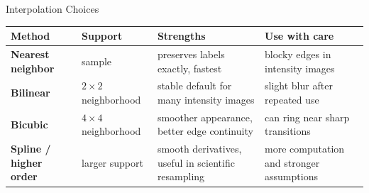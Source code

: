 \documentclass[aspectratio=169,10pt]{beamer}
\begin{document}
\begin{frame}{Interpolation Choices}
\small
\begin{tabularx}{\textwidth}{>{\bfseries}p{} >{\raggedright\arraybackslash}p{} >{\raggedright\arraybackslash}p{} X}
\toprule
Method & Support & Strengths & Use with care \\
\midrule
Nearest neighbor & 1 sample & preserves labels exactly, fastest & blocky edges in intensity images \\
Bilinear & $2 \times 2$ neighborhood & stable default for many intensity images & slight blur after repeated use \\
Bicubic & $4 \times 4$ neighborhood & smoother appearance, better edge continuity & can ring near sharp transitions \\
Spline / higher order & larger support & smooth derivatives, useful in scientific resampling & more computation and stronger assumptions \\
\bottomrule
\end{tabularx}


\end{frame}
\end{document}
